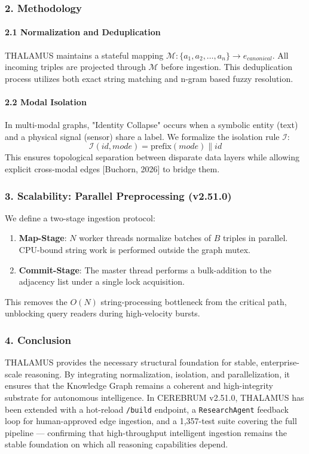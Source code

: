 \subsubsection{2. Methodology}

\paragraph{2.1 Normal\-ization and Dedupl\-ication}
THALAMUS maintains a stateful mapping $\mathcal{M}: \{a_1, a_2, \dots, a_n\} \to e_{canonical}$. All incoming triples are projected through $\mathcal{M}$ before ingestion. This dedup\-lication process \cite{doan2012principles} utilizes both exact string matching and n-gram based fuzzy resolution.

\paragraph{2.2 Modal Isolation}
In multi-modal graphs, "Identity Collapse" occurs when a symbolic entity (text) and a physical signal (sensor) share a label. We formalize the isolation rule $\mathcal{I}$:
\begin{equation}
\mathcal{I}(id, mode) = \text{prefix}(mode) \mathbin{\|} id
\end{equation}
This ensures topological separation between disparate data layers while allowing explicit cross-modal edges [Buchorn, 2026] to bridge them.

\subsubsection{3. Scalability: Parallel Prepro\-cessing (v2.51.0)}
We define a two-stage ingestion protocol:
\begin{enumerate}
\item \textbf{Map-Stage}: $N$ worker threads normalize batches of $B$ triples in parallel. CPU-bound string work is performed outside the graph mutex.
\item \textbf{Commit-Stage}: The master thread performs a bulk-addition to the adjacency list under a single lock acquisition.
\end{enumerate}
This removes the $O(N)$ string-processing bottleneck from the critical path, unblocking query readers during high-velocity bursts.

\subsubsection{4. Conclusion}
THALAMUS provides the necessary structural foundation for stable, enterprise-scale reasoning. By integrating norma\-lization, isolation, and paral\-lelization, it ensures that the Knowledge Graph remains a coherent and high-integrity substrate for autonomous intel\-ligence. In CEREBRUM v2.51.0, THALAMUS has been extended with a hot-reload \texttt{/build} endpoint, a \texttt{ResearchAgent} feedback loop for human-approved edge ingestion, and a 1,357-test suite covering the full pipeline — confirming that high-throughput intelligent ingestion remains the stable foundation on which all reasoning capab\-ilities depend.

